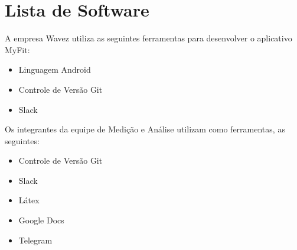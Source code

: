 \section{Lista de Software}
A empresa Wavez utiliza as seguintes ferramentas para desenvolver o aplicativo MyFit:
\begin{itemize}
\item Linguagem Android
\item Controle de Versão Git
\item Slack 
\end{itemize}
Os integrantes da equipe de Medição e Análise utilizam como ferramentas, as seguintes:
\begin{itemize}
\item Controle de Versão Git
\item Slack 
\item Látex
\item Google Docs
\item Telegram
\end{itemize}